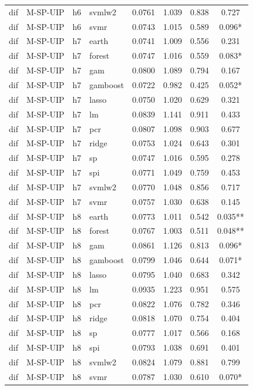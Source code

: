 \begin{ThreePartTable}
\begin{longtable}[t]{llclcccc}
dif & M-SP-UIP & h6 & svmlw2 & 0.0761 & 1.039 & 0.838 & 0.727\\
dif & M-SP-UIP & h6 & svmr & 0.0743 & 1.015 & 0.589 & 0.096*\\
\addlinespace
dif & M-SP-UIP & h7 & earth & 0.0741 & 1.009 & 0.556 & 0.231\\
dif & M-SP-UIP & h7 & forest & 0.0747 & 1.016 & 0.559 & 0.083*\\
dif & M-SP-UIP & h7 & gam & 0.0800 & 1.089 & 0.794 & 0.167\\
dif & M-SP-UIP & h7 & gamboost & 0.0722 & 0.982 & 0.425 & 0.052*\\
dif & M-SP-UIP & h7 & lasso & 0.0750 & 1.020 & 0.629 & 0.321\\
dif & M-SP-UIP & h7 & lm & 0.0839 & 1.141 & 0.911 & 0.433\\
dif & M-SP-UIP & h7 & pcr & 0.0807 & 1.098 & 0.903 & 0.677\\
dif & M-SP-UIP & h7 & ridge & 0.0753 & 1.024 & 0.643 & 0.301\\
dif & M-SP-UIP & h7 & sp & 0.0747 & 1.016 & 0.595 & 0.278\\
dif & M-SP-UIP & h7 & spi & 0.0771 & 1.049 & 0.759 & 0.453\\
dif & M-SP-UIP & h7 & svmlw2 & 0.0770 & 1.048 & 0.856 & 0.717\\
dif & M-SP-UIP & h7 & svmr & 0.0757 & 1.030 & 0.638 & 0.145\\
\addlinespace
dif & M-SP-UIP & h8 & earth & 0.0773 & 1.011 & 0.542 & 0.035**\\
dif & M-SP-UIP & h8 & forest & 0.0767 & 1.003 & 0.511 & 0.048**\\
dif & M-SP-UIP & h8 & gam & 0.0861 & 1.126 & 0.813 & 0.096*\\
dif & M-SP-UIP & h8 & gamboost & 0.0799 & 1.046 & 0.644 & 0.071*\\
dif & M-SP-UIP & h8 & lasso & 0.0795 & 1.040 & 0.683 & 0.342\\
dif & M-SP-UIP & h8 & lm & 0.0935 & 1.223 & 0.951 & 0.575\\
dif & M-SP-UIP & h8 & pcr & 0.0822 & 1.076 & 0.782 & 0.346\\
dif & M-SP-UIP & h8 & ridge & 0.0818 & 1.070 & 0.754 & 0.404\\
dif & M-SP-UIP & h8 & sp & 0.0777 & 1.017 & 0.566 & 0.168\\
dif & M-SP-UIP & h8 & spi & 0.0793 & 1.038 & 0.691 & 0.401\\
dif & M-SP-UIP & h8 & svmlw2 & 0.0824 & 1.079 & 0.881 & 0.799\\
dif & M-SP-UIP & h8 & svmr & 0.0787 & 1.030 & 0.610 & 0.070*\\

\end{longtable}
\end{ThreePartTable}
